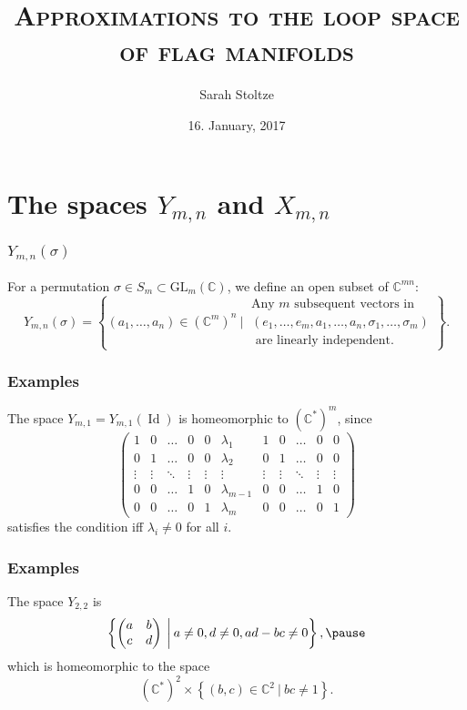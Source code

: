 \documentclass{beamer} %
\author{Sarah Stoltze}
\date{16. January, 2017}
\title[The loop space of flag manifolds]{\textsc{Approximations to the loop space of flag manifolds}}
\institute[IMF]{Institut for Matematik\\Aarhus University}
\newcommand{\C}{\mathbb{C}}
\newcommand{\delim}{\:}
\newcommand{\GL}{\mathrm{GL}}
\DeclareMathOperator{\Id}{Id}
\newcommand{\set}[1]{\left\{ #1 \right\}}
\renewcommand{\l}{\lambda}
\begin{document}
\begin{frame}
  \titlepage
\end{frame}

\section{The spaces $Y_{m,n}$ and $X_{m,n}$}

\begin{frame}
  \frametitle{$Y_{m,n}(\sigma)$}
  \begin{definition}
    For a permutation $\sigma\in S_m\subset \GL_m(\C)$, we define an
    open subset of $\C^{mn}$:
    \[ Y_{m,n}(\sigma) = \set{(a_1,\dots,a_n) \in (\C^m)^n
        \delim\Bigg\vert\delim
        \begin{matrix}
          \text{Any } m \text{ subsequent vectors in } \\
          (e_1,\dots,e_m,a_1,\dots,a_n,\sigma_1,\dots,\sigma_m) \\
          \text{ are linearly independent.}
        \end{matrix} }. \]
  \end{definition}
\end{frame}

\begin{frame}
  \frametitle{Examples}
  \begin{example}
    The space $Y_{m,1}=Y_{m,1}(\Id)$ is homeomorphic to $(\C^*)^m$,
    since
    \[ \begin{pmatrix}
      1&0&\dots&0&0&\l_1&1&0&\dots&0&0 \\
      0&1&\dots&0&0&\l_2&0&1&\dots&0&0 \\
      \vdots&\vdots&\ddots&\vdots&\vdots&\vdots&\vdots&\vdots&\ddots&\vdots&\vdots
      \\
      0&0&\dots&1&0&\l_{m-1}&0&0&\dots&1&0 \\
      0&0&\dots&0&1&\l_m&0&0&\dots&0&1
    \end{pmatrix} \]
    satisfies the condition iff $\l_i \neq 0$ for all $i$.
  \end{example}
\end{frame}

\begin{frame}
  \frametitle{Examples}
  \begin{example}
    The space $Y_{2,2}$ is
    \[ \set{
      \begin{pmatrix}
        a & b \\
        c & d
      \end{pmatrix} \delim\bigg\vert\delim a \neq 0, d \neq 0, ad-bc
      \neq 0 }, \pause \]
    which is homeomorphic to the space
    \[ (\C^*)^2 \times \set{(b,c)\in\C^2 \delim\vert\delim
      bc \neq 1}. \]
  \end{example}
\end{frame}
\end{document}
